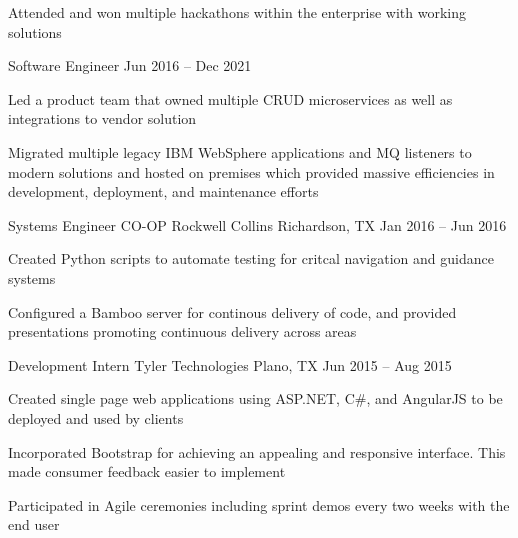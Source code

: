 \documentclass[]{awesome-cv}
\begin{document}
\begin{cventries}
{\begin{cvitems}
		\item {Attended and won multiple hackathons within the enterprise with working solutions }
		\end{cvitems}
	}
	\cventry
	{Software Engineer}
	{}
	{}
	{Jun 2016 – Dec 2021}
	{
	\begin{cvitems}
		\item {Led a product team that owned multiple CRUD microservices as well as integrations to vendor solution}
		\item {Migrated multiple legacy IBM WebSphere applications and MQ listeners to modern solutions and hosted on premises which provided massive efficiencies in development, deployment, and maintenance efforts }
		\end{cvitems}
	}

	\cventry
	{Systems Engineer CO-OP}
	{Rockwell Collins}
	{Richardson, TX}
	{Jan 2016 – Jun 2016}
	{\begin{cvitems}
		\item {Created Python scripts to automate testing for critcal navigation and guidance systems}
		\item {Configured a Bamboo server for continous delivery of code, and provided presentations promoting continuous delivery across areas }
		\end{cvitems}}

	\cventry
	{Development Intern}
	{Tyler Technologies}
	{Plano, TX}
	{Jun 2015 – Aug 2015}
	{\begin{cvitems}
		\item {Created single page web applications using ASP.NET, C\#, and AngularJS to be deployed and used by clients}
		\item {Incorporated Bootstrap  for achieving an appealing and responsive interface. This made consumer feedback easier to implement}
		\item {Participated in Agile ceremonies including sprint demos every two weeks with the end user}
		\end{cvitems}}

\end{cventries}
\end{document}
